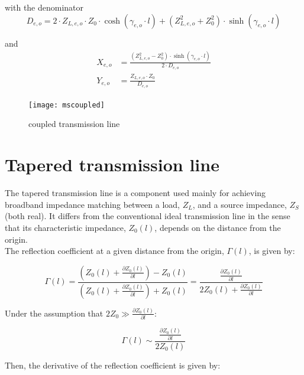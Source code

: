 with the denominator
\begin{equation}
D_{e,o} = 2\cdot Z_{L,e,o}\cdot Z_0\cdot \cosh(\gamma_{e,o}\cdot l)
         + \left(Z_{L,e,o}^2 + Z_0^2\right)\cdot \sinh\left(\gamma_{e,o}\cdot l\right)
\end{equation}

and
\begin{align}
X_{e,o} &= \frac{\left(Z_{L,e,o}^2 - Z_0^2\right)\cdot \sinh\left(\gamma_{e,o}\cdot l\right)}{2\cdot D_{e,o}}\\
Y_{e,o} &= \frac{Z_{L,e,o}\cdot Z_0}{D_{e,o}}
\end{align}

\begin{figure}[ht]
\begin{center}
\texttt{[image: mscoupled]}
\end{center}
\caption{coupled transmission line}
\label{fig:mscoupled}
\end{figure}
\FloatBarrier

\section{Tapered transmission line}

The tapered transmission line is a component used mainly for achieving broadband impedance matching between a load, $Z_L$, and a source impedance, $Z_S$ (both real). It differs from the conventional ideal transmission line in the sense that its characteristic impedance, $Z_0(l)$, depends on the distance from the origin.\\

\noindent The reflection coefficient at a given distance from the origin, $\Gamma(l)$, is given by:

\begin{equation}
  \Gamma(l) = \frac{(Z_0(l)+\frac{\partial Z_0(l)}{\partial l})-Z_0(l)}{(Z_0(l)+\frac{\partial Z_0(l)}{\partial l})+Z_0(l)} = \frac{\frac{\partial Z_0(l)}{\partial l}}{2 Z_0(l) + \frac{\partial Z_0(l)}{\partial l}}
\end{equation} 

\noindent Under the assumption that $2Z_0 \gg \frac{\partial Z_0(l)}{\partial l}$:

\begin{equation}
\Gamma(l) \sim \frac{\frac{\partial Z_0(l)}{\partial l}}{2Z_0(l)}
\end{equation}


\noindent Then, the derivative of the reflection coefficient is given by:

